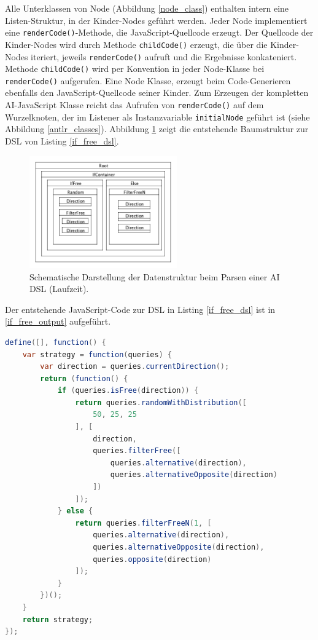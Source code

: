 \documentclass[conference]{IEEEtran}
\begin{document}
Alle Unterklassen von Node (Abbildung  \ref{node_class}) enthalten intern eine Listen-Struktur, in der Kinder-Nodes geführt werden. Jeder Node implementiert eine \texttt{renderCode()}-Methode, die JavaScript-Quellcode erzeugt. Der Quellcode der Kinder-Nodes wird durch Methode \texttt{childCode()} erzeugt, die über die Kinder-Nodes iteriert, jeweils \texttt{renderCode()} aufruft und die Ergebnisse konkateniert. Methode \texttt{childCode()} wird per Konvention in jeder Node-Klasse bei \texttt{renderCode()} aufgerufen. Eine Node Klasse, erzeugt beim Code-Generieren ebenfalls den JavaScript-Quellcode seiner Kinder. Zum Erzeugen der kompletten AI-JavaScript Klasse reicht das Aufrufen von \texttt{renderCode()} auf dem Wurzelknoten, der im Listener als Instanzvariable \texttt{initialNode} geführt ist (siehe Abbildung \ref{antlr_classes}). Abbildung \ref{node_structure_ex} zeigt die entstehende Baumstruktur zur DSL von Listing \ref{if_free_dsl}.


\begin{figure}[!htb]
\centering
\includegraphics[width=2.5in]{node_structure_ex.png}
\caption{Schematische Darstellung der Datenstruktur beim Parsen einer AI DSL (Laufzeit).}
\label{node_structure_ex}
\end{figure}

Der entstehende JavaScript-Code zur DSL in Listing \ref{if_free_dsl} ist in \ref{if_free_output} aufgeführt.

\begin{lstlisting}[language=Java, captionpos=b, caption=Beispiel zu generiertem JavaScript-Code einer AI DSL, label=if_free_output]
 define([], function() {
    var strategy = function(queries) {
        var direction = queries.currentDirection();
        return (function() {
            if (queries.isFree(direction)) {
                return queries.randomWithDistribution([
                    50, 25, 25
                ], [
                    direction,
                    queries.filterFree([
                        queries.alternative(direction),
                        queries.alternativeOpposite(direction)
                    ])
                ]);
            } else {
                return queries.filterFreeN(1, [
                    queries.alternative(direction),
                    queries.alternativeOpposite(direction),
                    queries.opposite(direction)
                ]);
            }
        })();
    }
    return strategy;
});
\end{lstlisting}
\end{document}

